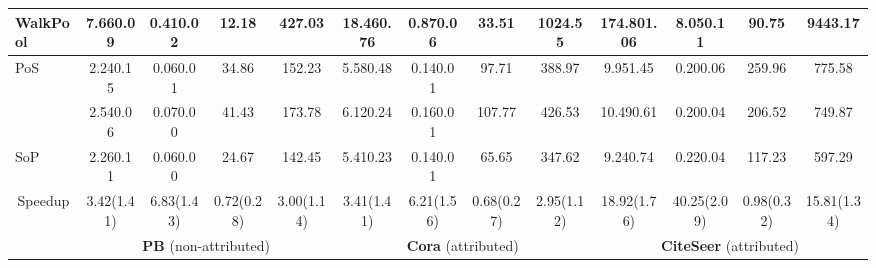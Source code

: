 \documentclass[sigconf, nonacm]{acmart}
\newcommand{\posplus}{\xspace}
\newcommand{\pos}{{P\lowercase{o}S}\xspace}
\newcommand{\sop}{{S\lowercase{o}P}\xspace}
\newcommand{\worst}{\cellcolor[rgb]{0.957,0.8,0.8}}
\newcommand{\best}{\cellcolor[rgb]{0.851,0.918,0.827}}
\begin{document}
\begin{table*}[h!]
{\begin{tabular}{l|cccc|cccc|cccc}
WalkPool                    & \worst7.66{\scriptsize0.09}       & \worst0.41{\scriptsize0.02}     & 12.18                                      & \worst427.03      & \worst18.46{\scriptsize0.76}     & \worst0.87{\scriptsize0.06}     & 33.51                                     & \worst1024.55    & \worst174.80{\scriptsize1.06}    & \worst8.05{\scriptsize0.11}     & 90.75                                      & \worst9443.17      \\ 
\hline
\pos                        & \best2.24{\scriptsize0.15}   & \best0.06{\scriptsize0.01} & 34.86                                      & 152.23                                      & 5.58{\scriptsize0.48}                                      & \best0.14{\scriptsize0.01} & 97.71                                     & 388.97                                     & 9.95{\scriptsize1.45}                                      & 0.20{\scriptsize0.06}                                     & \worst259.96     & \worst775.58       \\
\posplus                       & \worst2.54{\scriptsize0.06}       & \worst0.07{\scriptsize0.00}     & \worst41.43      & \worst173.78      & \worst6.12{\scriptsize0.24}      & \worst0.16{\scriptsize0.01}     & \worst107.77    & \worst426.53     & \worst10.49{\scriptsize0.61}     & \best0.20{\scriptsize0.04} & 206.52                                     & 749.87                                       \\
\sop                         & 2.26{\scriptsize0.11}                                       & 0.06{\scriptsize0.00}                                     & \best24.67  & \best142.45  & \best5.41{\scriptsize0.23}  & 0.14{\scriptsize0.01}                                     & \best65.65 & \best347.62 & \best9.24{\scriptsize0.74}  & \worst0.22{\scriptsize0.04}     & \best117.23 & \best597.29   \\ 
\hline
\multicolumn{1}{c}{Speedup} & 3.42(1.41)                                        & 6.83(1.43)                                      & 0.72(0.28)                                 & \multicolumn{1}{c}{3.00(1.14)}                 & 3.41(1.41)                                       & 6.21(1.56)                                      & 0.68(0.27)                                & \multicolumn{1}{c}{2.95(1.12)}             & 18.92(1.76)                                      & 40.25(2.09)                                     & 0.98(0.32)                                 & 15.81(1.34)                                  \\ 
\hline
\multicolumn{1}{l|}{}       & \multicolumn{4}{c|}{\textbf{PB }(non-attributed)}                                                                                                                                              & \multicolumn{4}{c|}{\textbf{Cora }(attributed)}                                                                                                                                             & \multicolumn{4}{c}{\textbf{CiteSeer }(attributed)}                                                                                                                                             \\ 

\end{tabular}}
\end{table*}
\end{document}
